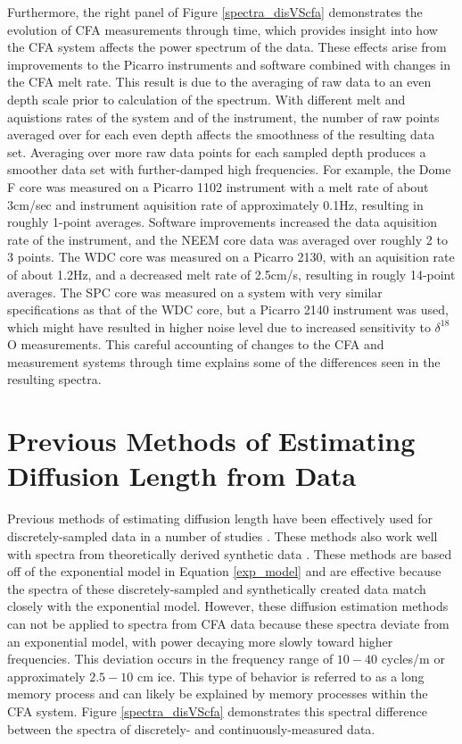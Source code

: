 \documentclass[draft, jgrga]{AGUTeX}
\begin{document}
\begin{article}
Furthermore, the right panel of Figure \ref{spectra_disVScfa} demonstrates the evolution of CFA measurements through time, which provides insight into how the CFA system affects the power spectrum of the data. These effects arise from improvements to the Picarro instruments and software combined with changes in the CFA melt rate. This result is due to the averaging of raw data to an even depth scale prior to calculation of the spectrum. With different melt and aquistions rates of the system and of the instrument, the number of raw points averaged over for each even depth affects the smoothness of the resulting data set. Averaging over more raw data points for each sampled depth produces a smoother data set with further-damped high frequencies. For example, the Dome F core was measured on a Picarro 1102 instrument with a melt rate of about 3cm/sec and instrument aquisition rate of approximately 0.1Hz, resulting in roughly 1-point averages. Software improvements increased the data aquisition rate of the instrument, and the NEEM core data was averaged over roughly 2 to 3 points. The WDC core was measured on a Picarro 2130, with an aquisition rate of about 1.2Hz, and a decreased melt rate of 2.5cm/s, resulting in rougly 14-point averages. The SPC core was measured on a system with very similar specifications as that of the WDC core, but a Picarro 2140 instrument was used, which might have resulted in higher noise level due to increased sensitivity to $\delta^{18}$O measurements. This careful accounting of changes to the CFA and measurement systems through time explains some of the differences seen in the resulting spectra.



\section{Previous Methods of Estimating Diffusion Length from Data}

Previous methods of estimating diffusion length have been effectively used for discretely-sampled data in a number of studies \citep{Johnsen2000,Simonsen2011,Gkinis2014,vanderWel2015}. These methods also work well with spectra from theoretically derived synthetic data \citep{Holme2017}. These methods are based off of the exponential model in Equation \ref{exp_model} and are effective because the spectra of these discretely-sampled and synthetically created data match closely with the exponential model. However, these diffusion estimation methods can not be applied to spectra from CFA data because these spectra deviate from an exponential model, with power decaying more slowly toward higher frequencies.  This deviation occurs in the frequency range of $10-40$ cycles/m or approximately $2.5-10$ cm ice. This type of behavior is referred to as a long memory process and can likely be explained by memory processes within the CFA system. Figure \ref{spectra_disVScfa} demonstrates this spectral difference between the spectra of discretely- and continuously-measured data.


\end{article}
\end{document}
